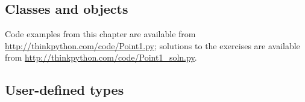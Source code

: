 \documentclass[10pt]{book}
\begin{document}
\begin{CJK}{UTF8}{gbsn}










\chapter{Classes and objects}

Code examples from this chapter are available from
\url{http://thinkpython.com/code/Point1.py}; solutions
to the exercises are available from
\url{http://thinkpython.com/code/Point1_soln.py}.


\section{User-defined types}
\label{point}


\end{CJK}
\end{document}
